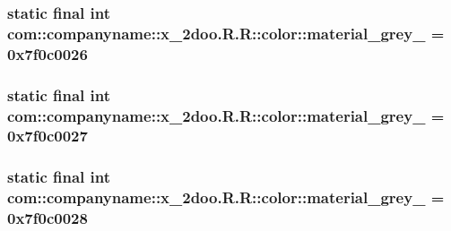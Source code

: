 \hypertarget{classcom_1_1companyname_1_1x__2doo_1_1_r_1_1color_9a638592ad643e9b6302d520a51187d9}{
\subsubsection[{material\_\-grey\_\-50}]{\setlength{\rightskip}{0pt plus 5cm}static final int com::companyname::x\_\-2doo.R.R::color::material\_\-grey\_ = 0x7f0c0026}}
\label{classcom_1_1companyname_1_1x__2doo_1_1_r_1_1color_9a638592ad643e9b6302d520a51187d9}


\hypertarget{classcom_1_1companyname_1_1x__2doo_1_1_r_1_1color_1eee063fbf01c79f00993f0e40e21b2e}{
\subsubsection[{material\_\-grey\_\-600}]{\setlength{\rightskip}{0pt plus 5cm}static final int com::companyname::x\_\-2doo.R.R::color::material\_\-grey\_ = 0x7f0c0027}}
\label{classcom_1_1companyname_1_1x__2doo_1_1_r_1_1color_1eee063fbf01c79f00993f0e40e21b2e}


\hypertarget{classcom_1_1companyname_1_1x__2doo_1_1_r_1_1color_37a14b858bb36438746e6c25f99e0f03}{
\subsubsection[{material\_\-grey\_\-800}]{\setlength{\rightskip}{0pt plus 5cm}static final int com::companyname::x\_\-2doo.R.R::color::material\_\-grey\_ = 0x7f0c0028}}
\label{classcom_1_1companyname_1_1x__2doo_1_1_r_1_1color_37a14b858bb36438746e6c25f99e0f03}


